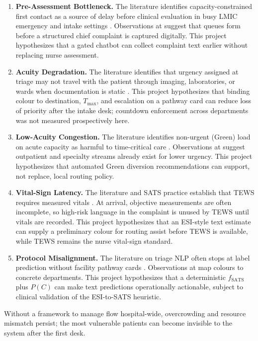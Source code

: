 \begin{enumerate}
\item \textbf{Pre-Assessment Bottleneck.} The literature identifies capacity-constrained first contact as a source of delay before clinical evaluation in busy LMIC emergency and intake settings \citep{Rominski2014,Mitchell2023}. Observations at \examplehospital{} suggest that queues form before a structured chief complaint is captured digitally. This project hypothesizes that a gated chatbot can collect complaint text earlier without replacing nurse assessment.
\item \textbf{Acuity Degradation.} The literature identifies that urgency assigned at triage may not travel with the patient through imaging, laboratories, or wards when documentation is static \citep{satsmanual,Sundstrom2014}. This project hypothesizes that binding colour to destination, \(T_{\max}\), and escalation on a pathway card can reduce loss of priority after the intake desk; countdown enforcement across departments was not measured prospectively here.
\item \textbf{Low-Acuity Congestion.} The literature identifies non-urgent (Green) load on acute capacity as harmful to time-critical care \citep{Yilmaz2021}. Observations at \examplehospital{} suggest outpatient and specialty streams already exist for lower urgency. This project hypothesizes that automated Green diversion recommendations can support, not replace, local routing policy.
\item \textbf{Vital-Sign Latency.} The literature and SATS practice establish that TEWS requires measured vitals \citep{satsmanual}. At arrival, objective measurements are often incomplete, so high-risk language in the complaint is unused by TEWS until vitals are recorded. This project hypothesizes that an ESI-style text estimate can supply a preliminary colour for routing assist before TEWS is available, while TEWS remains the nurse vital-sign standard.
\item \textbf{Protocol Misalignment.} The literature on triage NLP often stops at label prediction without facility pathway cards \citep{stewart2023nlp}. Observations at \examplehospital{} map colours to concrete departments. This project hypothesizes that a deterministic \(f_{\mathrm{SATS}}\) plus \(P(C)\) can make text predictions operationally actionable, subject to clinical validation of the ESI-to-SATS heuristic.
\end{enumerate}

Without a framework to manage flow hospital-wide, overcrowding and resource mismatch persist; the most vulnerable patients can become invisible to the system after the first desk.

